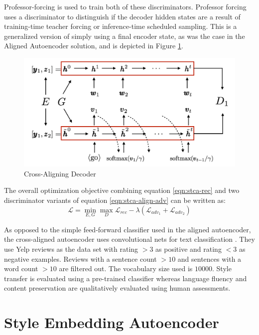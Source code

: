 Professor-forcing \citep{lamb2016professor} is used to train both of these discriminators. Professor forcing uses a discriminator to distinguish if the decoder hidden states are a result of training-time teacher forcing or inference-time scheduled sampling. This is a generalized version of simply using a final encoder state, as was the case in the Aligned Autoencoder solution, and is depicted in Figure \ref{fig:stca-cross-align}.

\begin{figure}[ht]
	\centering
	\includegraphics[width=\textwidth]{images/stca-cross-align}
	\caption{\label{fig:stca-cross-align} Cross-Aligning Decoder}
\end{figure}

The overall optimization objective combining equation \ref{eqn:stca-rec} and two discriminator variants of equation \ref{eqn:stca-align-adv} can be written as:
\begin{equation}
	\mathcal{L} = \operatorname*{min}_{E,G} \operatorname*{max}_{D} \mathcal{L}_{rec} - \lambda (\mathcal{L}_{adv_1} + \mathcal{L}_{adv_2})
\end{equation}

As opposed to the simple feed-forward classifier used in the aligned autoencoder, the cross-aligned autoencoder uses convolutional nets for text classification \citep{kim2014convolutional}. They use Yelp reviews as the data set with rating $>3$ as positive and rating $<3$ as negative examples. Reviews with a sentence count $>10$ and sentences with a word count $>10$ are filtered out. The vocabulary size used is $10000$. Style transfer is evaluated using a pre-trained classifier whereas language fluency and content preservation are qualitatively evaluated using human assessments.

\section{Style Embedding Autoencoder}

